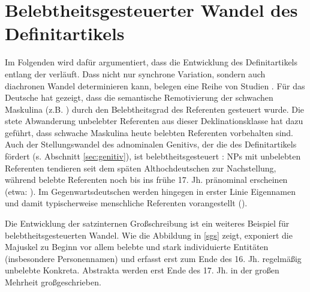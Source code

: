 \section{Belebtheitsgesteuerter Wandel des Definitartikels}\label{sec:belebtwandel}

Im Folgenden wird dafür argumentiert, dass die Entwicklung des Definitartikels  entlang der   verläuft. Dass  nicht nur synchrone Variation, sondern auch diachronen Wandel determinieren kann, belegen eine Reihe von Studien \parencite[vgl. die Übersicht in][]{Enger2011}. Für das Deutsche hat \textcite{Kopcke1995, Kopcke2000a,Kopcke2000,Kopcke2005} gezeigt, dass die semantische Remotivierung der schwachen Maskulina (z.B. )  durch den  Belebtheitsgrad   des Referenten gesteuert wurde. Die stete Abwanderung unbelebter  Referenten aus dieser Deklinationsklasse hat dazu geführt, dass schwache Maskulina  heute belebten  Referenten vorbehalten sind. 
Auch der Stellungswandel  des  adnominalen Genitivs, der die  des Definitartikels fördert (s. Abschnitt \ref{sec:genitiv}), ist belebtheitsgesteuert \parencite[215--223]{Demske2001}: NPs  mit unbelebten  Referenten tendieren seit dem späten Althochdeutschen zur Nachstellung, während belebte  Referenten noch bis ins frühe 17. Jh. pränominal  erscheinen (etwa: ). Im Gegenwartsdeutschen werden hingegen in erster Linie Eigennamen  und damit typischerweise menschliche Referenten vorangestellt  ().   

Die Entwicklung der satzinternen Großschreibung \parencite{Bergmann1998a,Bergmann1998,Bergmann1999,Szczepaniak2011,Szczepaniak2016} ist ein weiteres Beispiel für belebtheitsgesteuerten Wandel. Wie die Abbildung in \ref{sgs} zeigt, exponiert die Majuskel zu Beginn vor allem belebte  und stark individuierte  Entitäten (insbesondere Personennamen) und erfasst erst zum Ende des 16. Jh. regelmäßig unbelebte   Konkreta. Abstrakta  werden erst Ende des 17. Jh. in der großen Mehrheit großgeschrieben.   

